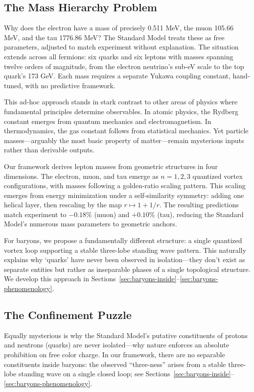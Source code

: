 \subsection{The Mass Hierarchy Problem}

Why does the electron have a mass of precisely 0.511 MeV, the muon 105.66 MeV, and the tau 1776.86 MeV? The Standard Model treats these as free parameters, adjusted to match experiment without explanation. The situation extends across all fermions: six quarks and six leptons with masses spanning twelve orders of magnitude, from the electron neutrino's sub-eV scale to the top quark's 173 GeV. Each mass requires a separate Yukawa coupling constant, hand-tuned, with no predictive framework.

This ad-hoc approach stands in stark contrast to other areas of physics where fundamental principles determine observables. In atomic physics, the Rydberg constant emerges from quantum mechanics and electromagnetism. In thermodynamics, the gas constant follows from statistical mechanics. Yet particle masses---arguably the most basic property of matter---remain mysterious inputs rather than derivable outputs.

Our framework derives lepton masses from geometric structures in four dimensions. The electron, muon, and tau emerge as $n=1,2,3$ quantized vortex configurations, with masses following a golden-ratio scaling pattern. This scaling emerges from energy minimization under a self-similarity symmetry: adding one helical layer, then rescaling by the map $r\mapsto 1+1/r$. The resulting predictions match experiment to $-0.18\%$ (muon) and $+0.10\%$ (tau), reducing the Standard Model's numerous mass parameters to geometric anchors.

For baryons, we propose a fundamentally different structure: a single quantized vortex loop supporting a stable three-lobe standing wave pattern. This naturally explains why `quarks' have never been observed in isolation---they don't exist as separate entities but rather as inseparable phases of a single topological structure. We develop this approach in Sections~\ref{sec:baryons-inside}--\ref{sec:baryons-phenomenology}.

\subsection{The Confinement Puzzle}

Equally mysterious is why the Standard Model's putative constituents of protons and neutrons (quarks) are never isolated---why nature enforces an absolute prohibition on free color charge. In our framework, there are no separable constituents inside baryons: the observed ``three-ness'' arises from a stable three-lobe standing wave on a single closed loop; see Sections~\ref{sec:baryons-inside}--\ref{sec:baryons-phenomenology}.

